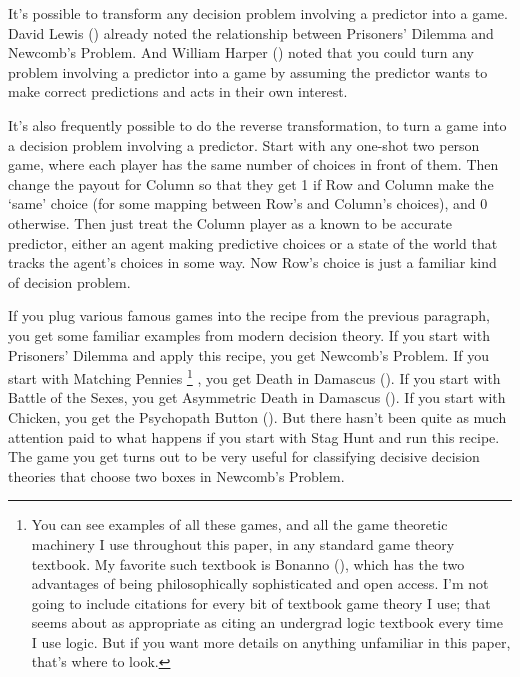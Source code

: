 \documentclass[
  10pt,
  letterpaper,
  DIV=11,
  numbers=noendperiod,
  twoside]{scrartcl}
\begin{document}
It's possible to transform any decision problem involving a predictor
into a game. David Lewis () already noted
the relationship between Prisoners' Dilemma and Newcomb's Problem. And
William Harper () noted that you could
turn any problem involving a predictor into a game by assuming the
predictor wants to make correct predictions and acts in their own
interest.

It's also frequently possible to do the reverse transformation, to turn
a game into a decision problem involving a predictor. Start with any
one-shot two person game, where each player has the same number of
choices in front of them. Then change the payout for Column so that they
get 1 if Row and Column make the `same' choice (for some mapping between
Row's and Column's choices), and 0 otherwise. Then just treat the Column
player as a known to be accurate predictor, either an agent making
predictive choices or a state of the world that tracks the agent's
choices in some way. Now Row's choice is just a familiar kind of
decision problem.

If you plug various famous games into the recipe from the previous
paragraph, you get some familiar examples from modern decision theory.
If you start with Prisoners' Dilemma and apply this recipe, you get
Newcomb's Problem. If you start with Matching Pennies \footnote{You can
  see examples of all these games, and all the game theoretic machinery
  I use throughout this paper, in any standard game theory textbook. My
  favorite such textbook is Bonanno (),
  which has the two advantages of being philosophically sophisticated
  and open access. I'm not going to include citations for every bit of
  textbook game theory I use; that seems about as appropriate as citing
  an undergrad logic textbook every time I use logic. But if you want
  more details on anything unfamiliar in this paper, that's where to
  look.} , you get Death in Damascus
(). If you
start with Battle of the Sexes, you get Asymmetric Death in Damascus
(). If you start with Chicken,
you get the Psychopath Button (). But there hasn't been quite as much attention paid to what
happens if you start with Stag Hunt and run this recipe. The game you
get turns out to be very useful for classifying decisive decision
theories that choose two boxes in Newcomb's Problem.
\end{document}
